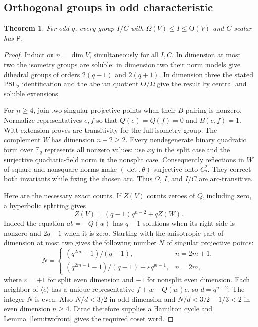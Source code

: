 \documentclass[11pt]{article}
\newtheorem{theorem}{Theorem}[section]
\theoremstyle{definition}
\newcommand{\F}{\mathbb F}
\newcommand{\Pp}{\mathsf P}
\newcommand{\PSL}{\mathrm{PSL}}
\newcommand{\Ogrp}{\mathrm O}
\begin{document}
\subsection{Orthogonal groups in odd characteristic}
\begin{theorem}\label{thm:orthodd}
For odd $q$, every group $I/C$ with $\Omega(V)\le I\le\Ogrp(V)$ and $C$ scalar has $\Pp$.
\end{theorem}
\begin{proof}
Induct on $n=\dim V$, simultaneously for all $I,C$. In dimension at most two the isometry groups are soluble: in dimension two their norm models give dihedral groups of orders $2(q-1)$ and $2(q+1)$. In dimension three the stated $\PSL_2$ identification and the abelian quotient $\Ogrp/\Omega$ give the result by central and soluble extensions.

For $n\ge4$, join two singular projective points when their $B$-pairing is nonzero. Normalize representatives $e,f$ so that $Q(e)=Q(f)=0$ and $B(e,f)=1$. Witt extension proves arc-transitivity for the full isometry group. The complement $W$ has dimension $n-2\ge2$. Every nondegenerate binary quadratic form over $\F_q$ represents all nonzero values: use $xy$ in the split case and the surjective quadratic-field norm in the nonsplit case. Consequently reflections in $W$ of square and nonsquare norms make $(\det,\theta)$ surjective onto $C_2^2$. They correct both invariants while fixing the chosen arc. Thus $\Omega$, $I$, and $I/C$ are arc-transitive.

Here are the necessary exact counts. If $Z(V)$ counts zeroes of $Q$, including zero, a hyperbolic splitting gives
\[
Z(V)=(q-1)q^{n-2}+qZ(W).
\]
Indeed the equation $ab=-Q(w)$ has $q-1$ solutions when its right side is nonzero and $2q-1$ when it is zero. Starting with the anisotropic part of dimension at most two gives the following number $N$ of singular projective points:
\[
N=\begin{cases}(q^{2m}-1)/(q-1),&n=2m+1,\\
(q^{2m-1}-1)/(q-1)+\varepsilon q^{m-1},&n=2m,
\end{cases}
\]
where $\varepsilon=+1$ for split even dimension and $-1$ for nonsplit even dimension. Each neighbor of $\langle e\rangle$ has a unique representative $f+w-Q(w)e$, so $d=q^{n-2}$. The integer $N$ is even. Also $N/d<3/2$ in odd dimension and $N/d<3/2+1/3<2$ in even dimension $n\ge4$. Dirac therefore supplies a Hamilton cycle and Lemma~\ref{lem:twofront} gives the required coset word.


\end{proof}
\end{document}
